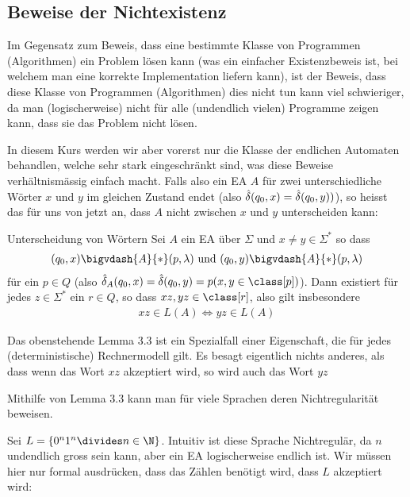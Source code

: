 \newpage
\subsection{Beweise der Nichtexistenz}
Im Gegensatz zum Beweis, dass eine bestimmte Klasse von Programmen (Algorithmen) ein Problem lösen kann
(was ein einfacher Existenzbeweis ist, bei welchem man eine korrekte Implementation liefern kann),
ist der Beweis, dass diese Klasse von Programmen (Algorithmen) dies nicht tun kann viel schwieriger,
da man (logischerweise) nicht für alle (undendlich vielen) Programme zeigen kann, dass sie das Problem nicht lösen.

In diesem Kurs werden wir aber vorerst nur die Klasse der endlichen Automaten behandlen, welche sehr stark eingeschränkt sind,
was diese Beweise verhältnismässig einfach macht.
Falls also ein EA $A$ für zwei unterschiedliche Wörter $x$ und $y$ im gleichen Zustand endet (also $\hat{\delta}(q_0, x) = \hat{\delta}(q_0, y))$),
so heisst das für uns von jetzt an, dass $A$ nicht zwischen $x$ und $y$ unterscheiden kann:

\begin{lemma}[]{Unterscheidung von Wörtern}
    Sei $A$ ein EA über $\Sigma$ und $x \neq y \in \Sigma^*$ so dass
    \begin{align*}
        (q_0, x) \bigvdash{A}{*} (p, \lambda) \text{ und } (q_0, y) \bigvdash{A}{*} (p, \lambda)
    \end{align*}
    für ein $p \in Q$ (also $\hdelta_A (q_0, x) = \hdelta(q_0, y) = p(x, y \in \class [p])$).
    Dann existiert für jedes $z \in \Sigma^*$ ein $r \in Q$, so dass $xz, yz \in \class[r]$, also gilt insbesondere
    \begin{align*}
        xz \in L(A) \Longleftrightarrow yz \in L(A)
    \end{align*}
\end{lemma}
Das obenstehende Lemma 3.3 ist ein Spezialfall einer Eigenschaft, die für jedes (deterministische) Rechnermodell gilt.
Es besagt eigentlich nichts anderes, als dass wenn das Wort $xz$ akzeptiert wird, so wird auch das Wort $yz$

Mithilfe von Lemma 3.3 kann man für viele Sprachen deren Nichtregularität beweisen.

\numberingOff
\inlineex Sei $L = \{ 0^n1^n \divides n \in \N \}$.
Intuitiv ist diese Sprache Nichtregulär, da $n$ undendlich gross sein kann, aber ein EA logischerweise endlich ist.
Wir müssen hier nur formal ausdrücken, dass das Zählen benötigt wird, dass $L$ akzeptiert wird:

